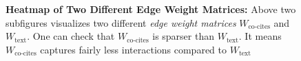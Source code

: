 \begin{figure}[t!]
    \begin{subfigure}[b]{0.49\textwidth}
    \end{subfigure}
    \hfill
    \begin{subfigure}[b]{0.49\textwidth}
    \end{subfigure}
    \label{fig:sparse_dense}
    \vfill
    \centering{
        
    }
    \caption{\textbf{Heatmap of Two Different Edge Weight Matrices: }Above two subfigures visualizes two different \textit{edge weight matrices} $W_{\text{co-cites}}$ and $W_{\text{text}}$. One can check that $W_{\text{co-cites}}$ is sparser than $W_{\text{text}}$. It means $W_\text{co-cites}$ captures fairly less interactions compared to $W_\text{text}$}
    \label{fig:heatmap:edgeweights:compare}
\end{figure}

